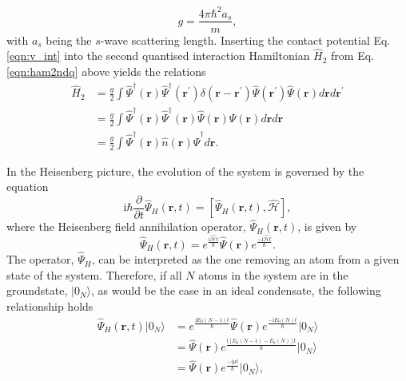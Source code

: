 \begin{equation}
	g = \frac{4\pi\hbar^2 a_s}{m},
\end{equation}
with $a_s$ being the $s$-wave scattering length. Inserting the contact potential Eq. \eqref{eqn:v_int} into the second quantised interaction Hamiltonian $\hat{H}_2$ from Eq. \eqref{eqn:ham2ndq} above yields the relations
\begin{subequations}
\begin{align}
\hat{H}_2 &= \frac{g}{2} \int \hat{\Psi}^{\dagger}(\mathbf{r})\hat{\Psi}^{\dagger}(\mathbf{r}^{\prime}) \delta\left(\textbf{r} - \textbf{r}^{\prime}\right)\hat{\Psi}(\mathbf{r}^{\prime})\hat{\Psi}(\textbf{r})d\textbf{r}d\textbf{r}^{\prime} \\
 & = \frac{g}{2}\int \hat{\Psi}^{\dagger}(\textbf{r})\hat{\Psi}^{\dagger}(\mathbf{r}) \hat{\Psi}(\mathbf{r})\hat{\Psi}(\mathbf{r})d\mathbf{r}d\mathbf{r} \\
 & = \frac{g}{2}\int \hat{\Psi}^{\dagger}\left(\mathbf{r}\right)\hat{n}\left(\mathbf{\mathbf{r}}\right)\hat{\Psi}^{\dagger}d\textbf{r}.
\end{align}
\end{subequations}

In the Heisenberg picture, the evolution of the system is governed by the equation
\begin{equation}\label{eqn:heisenberg}
\textrm{i}\hbar \frac{\partial}{\partial t}\hat{\Psi}_H\left(\mathbf{r}, t\right) = \left[\hat{\Psi}_{H}\left(\mathbf{r}, t\right), \hat{\mathcal{H}}  \right],
\end{equation}
where the Heisenberg field annihilation operator, $\hat{\Psi}_H\left(\textbf{r}, t\right)$, is given by
\begin{equation}\label{eqn:psi_heisenberg}
\hat{\Psi}_H\left(\mathbf{r}, {t} \right) = e^{\frac{\textrm{i}\hat{\mathcal{H}}t}{\hbar}}\hat{\Psi}\left(\mathbf{r}\right) e^{\frac{-\textrm{i}\hat{\mathcal{H}}t}{\hbar}}.
\end{equation}
The operator, $\hat{\Psi}_H$, can be interpreted as the one removing an atom from a given state of the system. Therefore, if all $N$ atoms in the system are in the groundstate, $\vert 0_N\rangle$, as would be the case in an ideal condensate, the following relationship holds
\begin{subequations}
\begin{align}
\hat{\Psi}_{H}(\mathbf{r},t)\vert 0_N \rangle &= e^{\frac{\textrm{i}E_0(N-1)t}{\hbar}}\hat{\Psi}(\mathbf{r})e^{\frac{-\textrm{i}E_0(N)t}{\hbar}}\vert 0_N \rangle \\
&= \hat{\Psi}(\mathbf{r})e^{\frac{\textrm{i}[E_0(N-1) - E_0(N)]t}{\hbar}} \vert 0_N \rangle \\
&= \hat{\Psi}(\mathbf{r})e^{\frac{-\textrm{i}\mu t}{\hbar}} \vert 0_N \rangle,\label{eqn:psi_dagger_time} %
\end{align}
\end{subequations}

